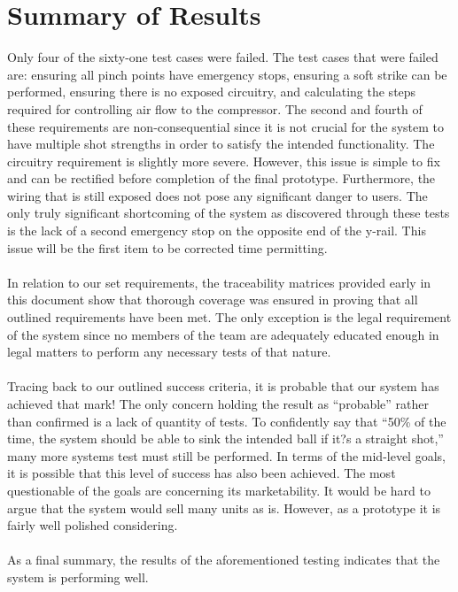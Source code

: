 \documentclass[titlepage]{article}
\begin{document}
\section{Summary of Results}
Only four of the sixty-one test cases were failed. The test cases that were failed are: ensuring all pinch points have emergency stops, ensuring a soft strike can be performed, ensuring there is no exposed circuitry, and calculating the steps required for controlling air flow to the compressor. The second and fourth of these requirements are non-consequential since it is not crucial for the system to have multiple shot strengths in order to satisfy the intended functionality. The circuitry requirement is slightly more severe. However, this issue is simple to fix and can be rectified before completion of the final prototype. Furthermore, the wiring that is still exposed does not pose any significant danger to users. The only truly significant shortcoming of the system as discovered through these tests is the lack of a second emergency stop on the opposite end of the y-rail. This issue will be the first item to be corrected time permitting.\\~\\
In relation to our set requirements, the traceability matrices provided early in this document show that thorough coverage was ensured in proving that all outlined requirements have been met. The only exception is the legal requirement of the system since no members of the team are adequately educated enough in legal matters to perform any necessary tests of that nature.\\~\\
Tracing back to our outlined success criteria, it is probable that our system has achieved that mark! The only concern holding the result as ``probable'' rather than confirmed is a lack of quantity of tests. To confidently say that ``50\% of the time, the system should be able to sink the intended ball if it?s a straight shot,'' many more systems test must still be performed. In terms of the mid-level goals, it is possible that this level of success has also been achieved. The most questionable of the goals are concerning its marketability. It would be hard to argue that the system would sell many units as is. However, as a prototype it is fairly well polished considering.\\~\\
As a final summary, the results of the aforementioned testing indicates that the system is performing well.
\end{document}
